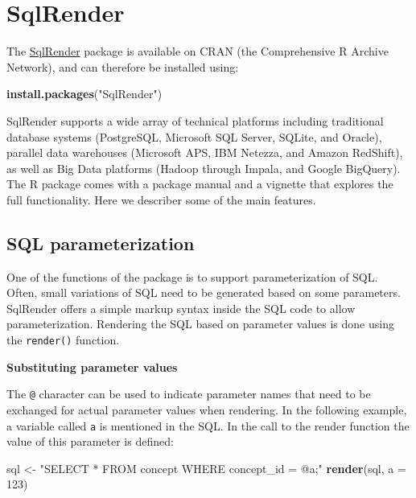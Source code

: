 \documentclass[11pt]{book}
\newenvironment{Shaded}{\begin{snugshade}}{\end{snugshade}}
\newcommand{\DataTypeTok}[1]{\textcolor[rgb]{0.13,0.29,0.53}{#1}}
\newcommand{\DecValTok}[1]{\textcolor[rgb]{0.00,0.00,0.81}{#1}}
\newcommand{\KeywordTok}[1]{\textcolor[rgb]{0.13,0.29,0.53}{\textbf{#1}}}
\newcommand{\NormalTok}[1]{#1}
\newcommand{\StringTok}[1]{\textcolor[rgb]{0.31,0.60,0.02}{#1}}
\theoremstyle{definition}
\theoremstyle{definition}
\theoremstyle{definition}
\theoremstyle{remark}
\begin{document}
\hypertarget{SqlRender}{%
\section{SqlRender}\label{SqlRender}}

The \href{https://ohdsi.github.io/SqlRender/}{SqlRender} package is available on CRAN (the Comprehensive R Archive Network), and can therefore be installed using:

\begin{Shaded}
\begin{Highlighting}[]
\KeywordTok{install.packages}\NormalTok{(}\StringTok{"SqlRender"}\NormalTok{)}
\end{Highlighting}
\end{Shaded}

SqlRender supports a wide array of technical platforms including traditional database systems (PostgreSQL, Microsoft SQL Server, SQLite, and Oracle), parallel data warehouses (Microsoft APS, IBM Netezza, and Amazon RedShift), as well as Big Data platforms (Hadoop through Impala, and Google BigQuery). The R package comes with a package manual and a vignette that explores the full functionality. Here we describer some of the main features.

\hypertarget{sql-parameterization}{%
\subsection{SQL parameterization}\label{sql-parameterization}}

One of the functions of the package is to support parameterization of SQL. Often, small variations of SQL need to be generated based on some parameters. SqlRender offers a simple markup syntax inside the SQL code to allow parameterization. Rendering the SQL based on parameter values is done using the \texttt{render()} function. 

\textbf{Substituting parameter values}

The \texttt{@} character can be used to indicate parameter names that need to be exchanged for actual parameter values when rendering. In the following example, a variable called \texttt{a} is mentioned in the SQL. In the call to the render function the value of this parameter is defined:

\begin{Shaded}
\begin{Highlighting}[]
\NormalTok{sql <-}\StringTok{ "SELECT * FROM concept WHERE concept_id = @a;"}
\KeywordTok{render}\NormalTok{(sql, }\DataTypeTok{a =} \DecValTok{123}\NormalTok{)}
\end{Highlighting}
\end{Shaded}
\end{document}
